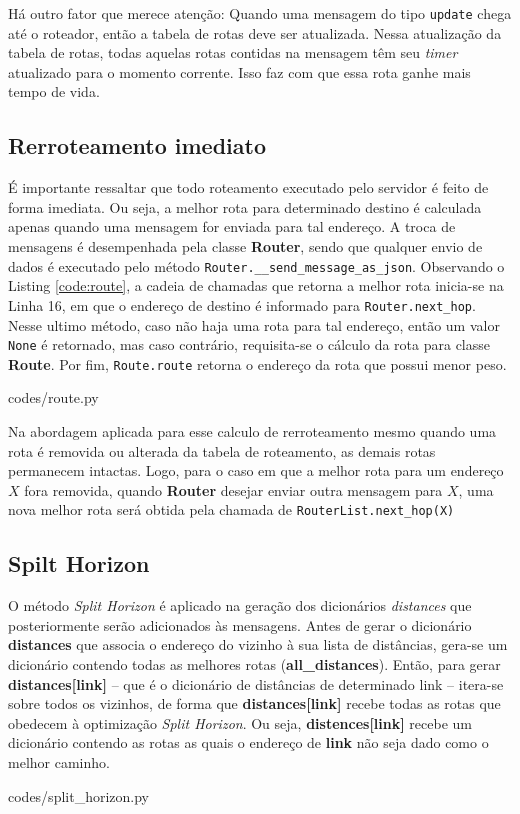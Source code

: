 Há outro fator que merece atenção: Quando uma mensagem do tipo \texttt{update}
chega até o roteador, então a tabela de rotas deve ser atualizada.
Nessa atualização da tabela de rotas, todas aquelas rotas contidas na mensagem
têm seu \textit{timer} atualizado para o momento corrente.
Isso faz com que essa rota ganhe mais tempo de vida.

\subsection{Rerroteamento imediato}
É importante ressaltar que todo roteamento executado pelo servidor é feito de
forma imediata.
Ou seja, a melhor rota para determinado destino é calculada apenas quando uma
mensagem for enviada para tal endereço.
A troca de mensagens é desempenhada pela classe \textbf{Router}, sendo que
qualquer envio de dados é executado pelo método \texttt{Router.\_\_send\_message\_as\_json}. 
Observando o Listing \ref{code:route}, a cadeia de chamadas que retorna a melhor
rota inicia-se na Linha 16, em que o endereço de destino é informado para
\texttt{Router.next\_hop}.
Nesse ultimo método, caso não haja uma rota para tal endereço, então um valor
\texttt{None} é retornado, mas caso contrário, requisita-se o cálculo da rota
para classe \textbf{Route}.
Por fim, \texttt{Route.route} retorna o endereço da rota que possui menor peso.


{codes/route.py}

Na abordagem aplicada para esse calculo de rerroteamento mesmo quando uma rota
é removida ou alterada da tabela de roteamento, as demais rotas permanecem
intactas.
Logo, para o caso em que a melhor rota para um endereço $X$ fora removida,
quando \textbf{Router} desejar enviar outra mensagem para $X$, uma nova melhor
rota será obtida pela chamada de \texttt{RouterList.next\_hop(X)}

\subsection{Spilt Horizon}
O método \textit{Split Horizon} é aplicado na geração dos dicionários
\textit{distances} que posteriormente serão adicionados às mensagens.
Antes de gerar o dicionário \textbf{distances} que associa o endereço do
vizinho à sua lista de distâncias, gera-se um dicionário contendo todas as
melhores rotas (\textbf{all\_distances}).
Então, para gerar \textbf{distances[link]} -- que é o dicionário de distâncias
de determinado link -- itera-se sobre todos os vizinhos, de forma que
\textbf{distances[link]} recebe todas as rotas que obedecem à optimização
\textit{Split Horizon}.
Ou seja, \textbf{distences[link]} recebe um dicionário contendo as rotas as
quais o endereço de \textbf{link} não seja dado como o melhor caminho.


{codes/split_horizon.py}
